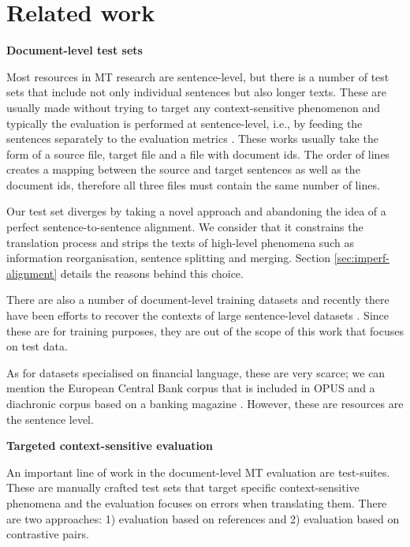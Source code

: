 \section{Related work}
\label{sec:related_work}



\textbf{Document-level test sets}

Most resources in MT research are sentence-level, but there is a number of test sets that include not only individual sentences but also longer texts. These are usually made without trying to target any context-sensitive phenomenon and typically the evaluation is performed at sentence-level, i.e., by feeding the sentences separately to the evaluation metrics \cite{anastasopoulos-etal-2020-tico, goyal2022flores, federmann-etal-2022-ntrex,deutsch-etal-2023-training}.
These works usually take the form of a source file, target file and a file with document ids. The order of lines creates a mapping between the source and target sentences as well as the document ids, therefore all three files must contain the same number of lines.

Our test set diverges by taking a novel approach and abandoning the idea of a perfect sentence-to-sentence alignment. We consider that it constrains the translation process and strips the texts of high-level phenomena such as information reorganisation, sentence splitting and merging. 
Section \ref{sec:imperf-alignment} details the reasons behind this choice.

There are also a number of document-level training datasets \cite{koehn-2005-europarl, cettolo2012wit3, tiedemann-2012-parallel, lison-tiedemann-2016-opensubtitles2016} and recently there have been efforts to recover the contexts of large sentence-level datasets \cite{wicks2024recovering}. Since these are for training purposes, they are out of the scope of this work that focuses on test data.

As for datasets specialised on financial language, these are very scarce; we can mention the European Central Bank corpus that is included in OPUS \cite{tiedemann_opus} and a diachronic corpus based on a banking magazine \cite{volk_banking}. However, these are resources are the sentence level.

\textbf{Targeted context-sensitive evaluation}

An important line of work in the document-level MT evaluation are test-suites. These are manually crafted test sets that target specific context-sensitive phenomena and the evaluation focuses on errors when translating them. There are two approaches: 1) evaluation based on references and 2) evaluation based on contrastive pairs.

